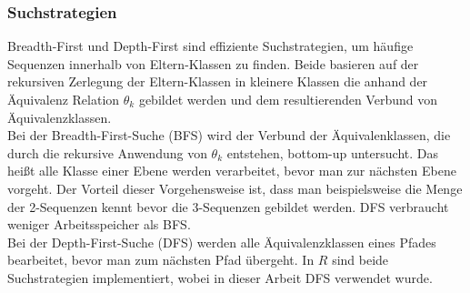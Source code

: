 \subsubsection*{Suchstrategien}
Breadth-First und Depth-First sind effiziente Suchstrategien, um häufige Sequenzen innerhalb von Eltern-Klassen zu finden. Beide basieren auf der rekursiven Zerlegung der Eltern-Klassen in kleinere Klassen die anhand der Äquivalenz Relation $\theta_k$ gebildet werden und dem resultierenden Verbund von Äquivalenzklassen.\\
Bei der Breadth-First-Suche (BFS) wird der Verbund der Äquivalenklassen, die durch die rekursive Anwendung von $\theta_k$ entstehen, bottom-up untersucht. Das heißt alle Klasse einer Ebene werden verarbeitet, bevor man zur nächsten Ebene vorgeht. Der Vorteil dieser Vorgehensweise ist, dass man beispielsweise die Menge der 2-Sequenzen kennt bevor die 3-Sequenzen gebildet werden. DFS verbraucht weniger Arbeitsspeicher als BFS.\\
Bei der Depth-First-Suche (DFS) werden alle Äquivalenzklassen eines Pfades bearbeitet, bevor man zum nächsten Pfad übergeht. In $R$ sind beide Suchstrategien implementiert, wobei in dieser Arbeit DFS verwendet wurde.


